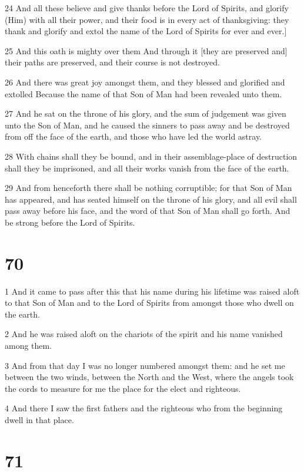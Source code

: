 \par 24 And all these believe and give thanks before the Lord of Spirits, and glorify (Him) with all their power, and their food is in every act of thanksgiving: they thank and glorify and extol the name of the Lord of Spirits for ever and ever.]
\par 25 And this oath is mighty over them And through it [they are preserved and] their paths are preserved, and their course is not destroyed.
\par 26 And there was great joy amongst them, and they blessed and glorified and extolled Because the name of that Son of Man had been revealed unto them.
\par 27 And he sat on the throne of his glory, and the sum of judgement was given unto the Son of Man, and he caused the sinners to pass away and be destroyed from off the face of the earth, and those who have led the world astray.
\par 28 With chains shall they be bound, and in their assemblage-place of destruction shall they be imprisoned, and all their works vanish from the face of the earth.
\par 29 And from henceforth there shall be nothing corruptible; for that Son of Man has appeared, and has seated himself on the throne of his glory, and all evil shall pass away before his face, and the word of that Son of Man shall go forth. And be strong before the Lord of Spirits.

\chapter{70}

\par 1 And it came to pass after this that his name during his lifetime was raised aloft to that Son of Man and to the Lord of Spirits from amongst those who dwell on the earth.
\par 2 And he was raised aloft on the chariots of the spirit and his name vanished among them.
\par 3 And from that day I was no longer numbered amongst them: and he set me between the two winds, between the North and the West, where the angels took the cords to measure for me the place for the elect and righteous.
\par 4 And there I saw the first fathers and the righteous who from the beginning dwell in that place.

\chapter{71}

